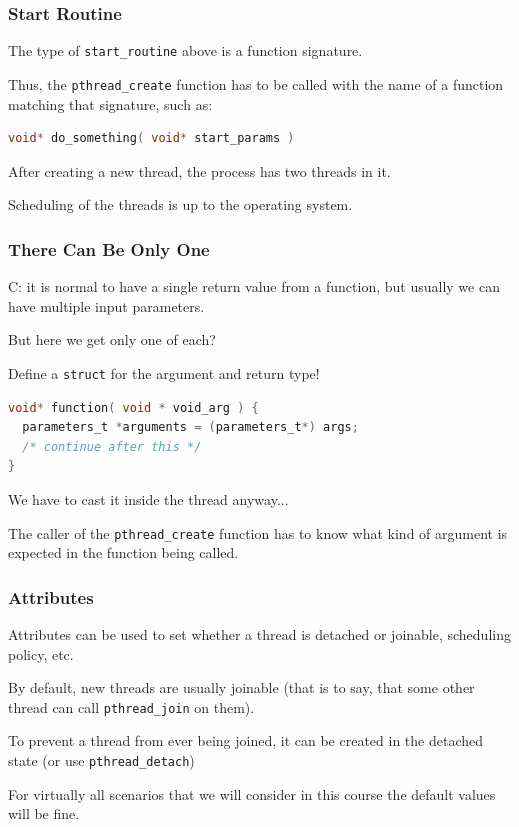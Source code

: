 \begin{frame}[fragile]
\frametitle{Start Routine}

The type of \texttt{start\_routine} above is a function signature. 

Thus, the \texttt{pthread\_create} function has to be called with the name of a function matching that signature, such as:

\begin{lstlisting}[language=C]
void* do_something( void* start_params )
\end{lstlisting}

After creating a new thread, the process has two threads in it.

Scheduling of the threads is up to the operating system.

\end{frame}


\begin{frame}[fragile]
\frametitle{There Can Be Only One}

C: it is normal to have a single return value from a function, but usually we can have multiple input parameters.

But here we get only one of each?

Define a \texttt{struct} for the argument and return type!

\begin{lstlisting}[language=C]
void* function( void * void_arg ) {
  parameters_t *arguments = (parameters_t*) args;
  /* continue after this */
}
\end{lstlisting}

We have to cast it inside the thread anyway...

The caller of the \texttt{pthread\_create} function has to know what kind of argument is expected in the function being called.

\end{frame}


\begin{frame}
\frametitle{Attributes}

Attributes can be used to set whether a thread is detached or joinable, scheduling policy, etc. 

By default, new threads are usually joinable (that is to say, that some other thread can call \texttt{pthread\_join} on them).

To prevent a thread from ever being joined, it can be created in the detached state (or use \texttt{pthread\_detach})

For virtually all scenarios that we will consider in this course the default values will be fine. 

\end{frame}

